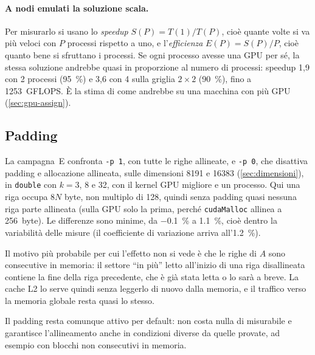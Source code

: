 \documentclass[11pt,a4paper]{article}
\begin{document}
\paragraph{A nodi emulati la soluzione scala.} Per misurarlo si usano lo
\emph{speedup} $S(P) = T(1)/T(P)$, cioè quante volte si va più veloci con $P$
processi rispetto a uno, e l'\emph{efficienza} $E(P) = S(P)/P$, cioè quanto bene
si sfruttano i processi. Se ogni processo avesse una GPU
per sé, la stessa soluzione andrebbe quasi in proporzione al numero di
processi: speedup 1,9 con 2 processi (\SI{95}{\percent}) e 3,6 con 4 sulla
griglia $2 \times 2$ (\SI{90}{\percent}), fino a 1253~GFLOPS. È la stima di
come andrebbe su una macchina con più GPU (\cref{sec:gpu-assign}).

\subsection{Padding}\label{sec:ris-padding}
La campagna~E confronta
\texttt{-p 1}, con tutte le righe allineate, e \texttt{-p 0}, che disattiva
padding e allocazione allineata, sulle dimensioni 8191 e 16383
(\cref{sec:dimensioni}), in \texttt{double} con $k = 3$, 8 e 32, con il kernel
GPU migliore e un processo. Qui una riga occupa $8N$ byte, non multiplo di 128,
quindi senza padding quasi nessuna riga parte allineata (sulla GPU solo
la prima, perché \texttt{cudaMalloc} allinea a \SI{256}{byte}). Le differenze
sono minime, da \SI{-0.1}{\percent} a \SI[retain-explicit-plus]{+1.1}{\percent}, cioè dentro la variabilità delle
misure (il coefficiente di variazione arriva all'\SI{1.2}{\percent}).

 Il motivo più probabile per cui
l'effetto non si vede è che le righe di $A$ sono consecutive in memoria: il
settore ``in più'' letto all'inizio di una riga disallineata contiene la fine
della riga precedente, che è già stata letta o lo sarà a breve. La cache L2 lo
serve quindi senza leggerlo di nuovo dalla memoria, e il traffico verso la
memoria globale resta quasi lo stesso.

Il padding resta comunque attivo per default: non costa nulla di misurabile e
garantisce l'allineamento anche in condizioni diverse da quelle provate, ad
esempio con blocchi non consecutivi in memoria.
\end{document}
